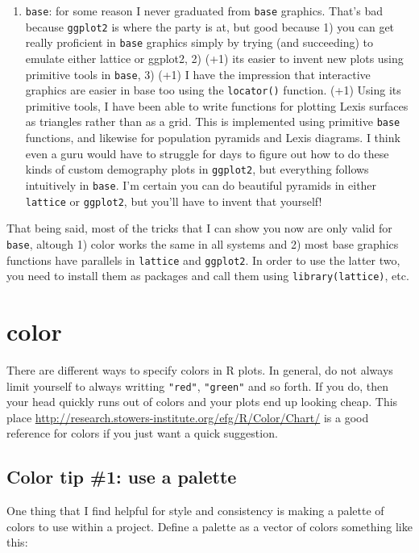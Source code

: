 \documentclass[a4paper]{article}
\begin{document}
\begin{enumerate}
\item{\texttt{base}}: for some reason I never graduated from \texttt{base} graphics. That's bad because \texttt{ggplot2} is where the party is at, but good because 1) you can get really proficient in \texttt{base} graphics simply by trying (and succeeding) to emulate either lattice or ggplot2, 2) (+1) its easier to invent new plots using primitive tools in \texttt{base}, 3) (+1) I have the impression that interactive graphics are easier in base too using the \texttt{locator()} function. (+1) Using its primitive tools, I have been able to write functions for plotting Lexis surfaces as triangles rather than as a grid. This is implemented using primitive \texttt{base} functions, and likewise for population pyramids and Lexis diagrams. I think even a guru would have to struggle for days to figure out how to do these kinds of custom demography plots in \texttt{ggplot2}, but everything follows intuitively in \texttt{base}. I'm certain you can do beautiful pyramids in either \texttt{lattice} or \texttt{ggplot2}, but you'll have to invent that yourself!
\end{enumerate}

That being said, most of the tricks that I can show you now are only valid for \texttt{base}, altough 1) color works the same in all systems and 2) most base graphics functions have parallels in \texttt{lattice} and \texttt{ggplot2}. In order to use the latter two, you need to install them as packages and call them using \texttt{library(lattice)}, etc.
\section{color}
There are different ways to specify colors in R plots. In general, do not always limit yourself to always writting \texttt{"red"}, \texttt{"green"} and so forth. If you do, then your head quickly runs out of colors and your plots end up looking cheap. This place \url{http://research.stowers-institute.org/efg/R/Color/Chart/} is a good reference for colors if you just want a quick suggestion. 

\subsection{Color tip \#1: use a palette}
One thing that I find helpful for style and consistency is making a palette of colors to use within a project. Define a palette as a vector of colors something like this:
\end{document}
